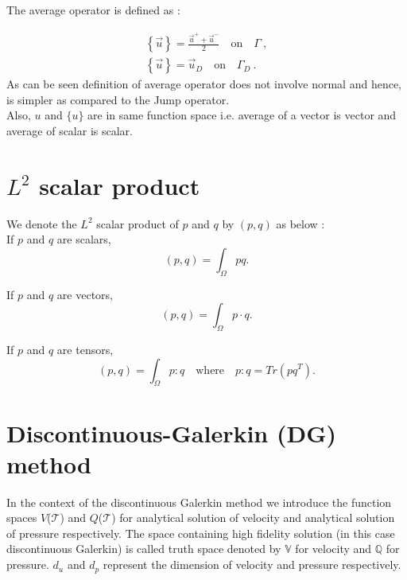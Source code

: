 \documentclass[a4paper,oneside,openright,spanish,english]{book}
\begin{document}
The average operator is defined as :

\begin{equation}
\begin{split}
\left\lbrace \overrightarrow{u} \right\rbrace = \frac{\overrightarrow{u}^+ + \overrightarrow{u}^-}{2} \quad \textrm{on} \quad \Gamma \ , \\
\left\lbrace \overrightarrow{u} \right\rbrace = \overrightarrow{u}_D \quad \textrm{on} \quad \Gamma_D \ .
\end{split}
\end{equation} 
\noindent
As can be seen definition of average operator does not involve normal and hence, is simpler as compared to the Jump operator.\\
Also, $u$ and $\lbrace u \rbrace$ are in same function space i.e. average of a vector is vector and average of scalar is scalar.\\

\section{$L^2$ scalar product}

We denote the $L^2$ scalar product of $p$ and $q$ by $(p,q)$ as below :\\

If $p$ and $q$ are scalars,
\begin{equation}\label{inner product scalars}
(p,q)=\int_{\Omega} pq \textrm{.}
\end{equation}

If $p$ and $q$ are vectors,
\begin{equation}\label{Inner product vectors}
(p,q)=\int_{\Omega} p \cdot q \textrm{.}
\end{equation}

If $p$ and $q$ are tensors,
\begin{equation}\label{Inner product tensors}
(p,q)=\int_{\Omega} p : q \quad \textrm{where} \quad p:q = Tr(pq^T) \textrm{.}
\end{equation}

\section{Discontinuous-Galerkin (DG) method}

In the context of the discontinuous Galerkin method we introduce the function spaces $V$($\mathcal{T}$) and $Q$($\mathcal{T}$) for analytical solution of velocity and analytical solution of pressure respectively. The space containing high fidelity solution (in this case discontinuous Galerkin) is called truth space denoted by $\mathbb{V}$ for velocity and $\mathbb{Q}$ for pressure. $d_u$ and $d_p$ represent the dimension of velocity and pressure respectively.
\end{document}
